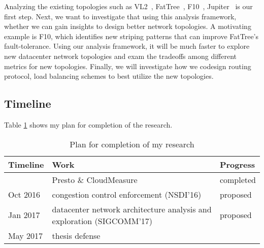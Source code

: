 Analyzing the existing topologies such as VL2~\cite{vl2}, FatTree~\cite{fattree}, F10~\cite{liu2013f10}, 
Jupiter~\cite{singh2015jupiter} is our first step. Next, we want to investigate that using 
this analysis framework, whether we can gain insights to design better network topologies. 
A motivating example is F10, which identifies new striping patterns that can 
improve FatTree's fault-tolerance. Using our analysis framework, it will be much faster 
to explore new datacenter network topologies and exam the tradeoffs among different metrics 
for new topologies. Finally, we will investigate how we codesign routing protocol, 
load balancing schemes to best utilize the new topologies. 

\subsection{Timeline}

Table \ref{tab:plan} shows my plan for completion of the research.

\begin{table}[hc]
\begin{small}
\begin{center}
\begin{tabular}{lll}
Timeline & Work & Progress\\
\hline
          & Presto \& CloudMeasure & completed\\
Oct 2016 & congestion control enforcement (NSDI'16) & proposed\\
Jan 2017 & datacenter network architecture analysis and exploration (SIGCOMM'17)  & proposed\\
May 2017 & thesis defense & \\
\end{tabular}
\end{center}
\end{small}
\caption{Plan for completion of my research}
\label{tab:plan}
\end{table}

